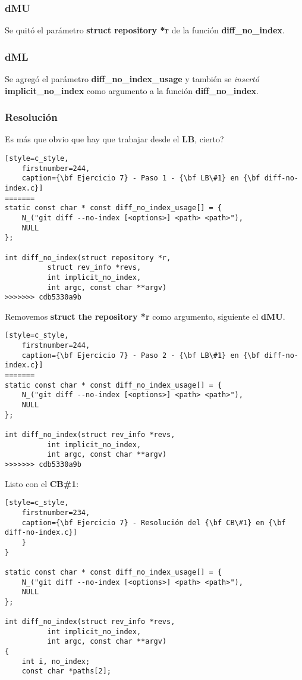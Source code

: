 \subsubsection*{dMU}
Se quitó el parámetro {\bf struct repository *r} de la función {\bf diff\_no\_index}.

\subsubsection*{dML}
Se agregó el parámetro {\bf diff\_no\_index\_usage} y también se {\it insertó} {\bf implicit\_no\_index} como argumento
a la función {\bf diff\_no\_index}.

\subsubsection*{Resolución}
Es más que obvio que hay que trabajar desde el {\bf LB}, cierto?

\begin{lstlisting}[style=c_style,
	firstnumber=244,
	caption={\bf Ejercicio 7} - Paso 1 - {\bf LB\#1} en {\bf diff-no-index.c}]
=======
static const char * const diff_no_index_usage[] = {
	N_("git diff --no-index [<options>] <path> <path>"),
	NULL
};

int diff_no_index(struct repository *r,
		  struct rev_info *revs,
		  int implicit_no_index,
		  int argc, const char **argv)
>>>>>>> cdb5330a9b
\end{lstlisting}

Removemos {\bf struct the repository *r} como argumento, siguiente el {\bf dMU}.

\begin{lstlisting}[style=c_style,
	firstnumber=244,
	caption={\bf Ejercicio 7} - Paso 2 - {\bf LB\#1} en {\bf diff-no-index.c}]
=======
static const char * const diff_no_index_usage[] = {
	N_("git diff --no-index [<options>] <path> <path>"),
	NULL
};

int diff_no_index(struct rev_info *revs,
		  int implicit_no_index,
		  int argc, const char **argv)
>>>>>>> cdb5330a9b
\end{lstlisting}

Listo con el {\bf CB\#1}:

\begin{lstlisting}[style=c_style,
	firstnumber=234,
	caption={\bf Ejercicio 7} - Resolución del {\bf CB\#1} en {\bf diff-no-index.c}]
	}
}

static const char * const diff_no_index_usage[] = {
	N_("git diff --no-index [<options>] <path> <path>"),
	NULL
};

int diff_no_index(struct rev_info *revs,
		  int implicit_no_index,
		  int argc, const char **argv)
{
	int i, no_index;
	const char *paths[2];
\end{lstlisting}

